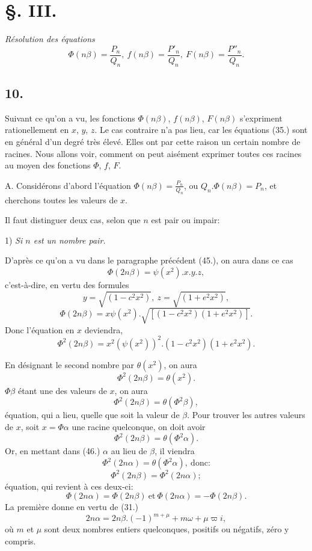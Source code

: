 \documentclass{article}
\begin{document}
\section*{§. III.}

\emph{Résolution des équations}
\[ \Phi(n\beta)=\frac{P_n}{Q_n},\ f(n\beta)=\frac{P'_n}{Q_n},\ F(n\beta)=\frac{P''_n}{Q_n}. \]

\subsection*{10.}

Suivant ce qu'on a vu, les fonctions $\Phi(n\beta)$, $f(n\beta)$, $F(n\beta)$ s'expriment rationellement en $x$, $y$, $z$. Le cas contraire n'a pas lieu, car les équations (35.) sont en général d'un degré très élevé. Elles ont par cette raison un certain nombre de racines. Nous allons voir, comment on peut aisément exprimer toutes ces racines au moyen des fonctions $\Phi$, $f$, $F$.

A. Considérons d'abord l'équation $\Phi(n\beta)=\frac{P_n}{Q_n}$, ou $Q_n.\Phi(n\beta)=P_n$, et cherchons toutes les valeurs de $x$.

Il faut distinguer deux cas, selon que $n$ est pair ou impair:

1) \emph{Si $n$ est un nombre pair.}

D'après ce qu'on a vu dans le paragraphe précédent (45.), on aura dans ce cas
\[ \Phi(2n\beta)=\psi(x^{2}).x.y.z, \]
c'est-à-dire, en vertu des formules
\[ y=\sqrt{(1-c^{2}x^{2})},\ z=\sqrt{(1+e^{2}x^{2})}, \]
\[ \Phi(2n\beta)=x\psi(x^{2}).\sqrt{[(1-c^{2}x^{2})(1+e^{2}x^{2})]}. \]
Donc l'équation en $x$ deviendra,
\[ \Phi^{2}(2n\beta)=x^{2}(\psi(x^{2}))^{2}.(1-c^{2}x^{2})(1+e^{2}x^{2}). \]

En désignant le second nombre par $\theta(x^{2})$, on aura
\[ \Phi^{2}(2n\beta)=\theta(x^{2}). \]
$\Phi\beta$ étant une des valeurs de $x$, on aura
\[ \Phi^{2}(2n\beta)=\theta(\Phi^{2}\beta), \tag{46.} \]
équation, qui a lieu, quelle que soit la valeur de $\beta$. Pour trouver les autres valeurs de $x$, soit $x=\Phi\alpha$ une racine quelconque, on doit avoir
\[ \Phi^{2}(2n\beta)=\theta(\Phi^{2}\alpha). \]
Or, en mettant dans (46.) $\alpha$ au lieu de $\beta$, il viendra
\[ \Phi^{2}(2n\alpha)=\theta(\Phi^{2}\alpha),\ \text{donc:} \]
\[ \Phi^{2}(2n\beta)=\Phi^{2}(2n\alpha); \tag{47.} \]
équation, qui revient à ces deux-ci:
\[ \Phi(2n\alpha)=\Phi(2n\beta)\ \text{et}\ \Phi(2n\alpha)=-\Phi(2n\beta). \]
La première donne en vertu de (31.)
\[ 2n\alpha=2n\beta.(-1)^{m+\mu}+m\omega+\mu\varpi i, \]
où $m$ et $\mu$ sont deux nombres entiers quelconques, positifs ou négatifs, zéro y compris.
\end{document}

